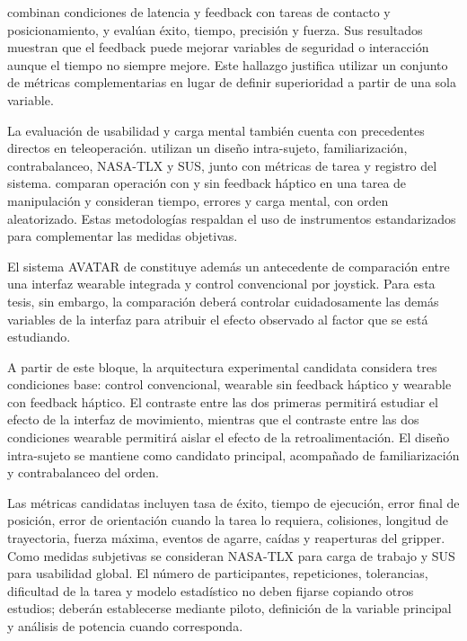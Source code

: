 \textcite{louca2024haptic} combinan condiciones de latencia y feedback con tareas de contacto y posicionamiento, y evalúan éxito, tiempo, precisión y fuerza. Sus resultados muestran que el feedback puede mejorar variables de seguridad o interacción aunque el tiempo no siempre mejore. Este hallazgo justifica utilizar un conjunto de métricas complementarias en lugar de definir superioridad a partir de una sola variable.

La evaluación de usabilidad y carga mental también cuenta con precedentes directos en teleoperación. \textcite{senft2021tasklevel} utilizan un diseño intra-sujeto, familiarización, contrabalanceo, NASA-TLX y SUS, junto con métricas de tarea y registro del sistema. \textcite{rodriguezsedano2024haptic} comparan operación con y sin feedback háptico en una tarea de manipulación y consideran tiempo, errores y carga mental, con orden aleatorizado. Estas metodologías respaldan el uso de instrumentos estandarizados para complementar las medidas objetivas.

El sistema AVATAR de \textcite{park2018avatar} constituye además un antecedente de comparación entre una interfaz wearable integrada y control convencional por joystick. Para esta tesis, sin embargo, la comparación deberá controlar cuidadosamente las demás variables de la interfaz para atribuir el efecto observado al factor que se está estudiando.

A partir de este bloque, la arquitectura experimental candidata considera tres condiciones base: control convencional, wearable sin feedback háptico y wearable con feedback háptico. El contraste entre las dos primeras permitirá estudiar el efecto de la interfaz de movimiento, mientras que el contraste entre las dos condiciones wearable permitirá aislar el efecto de la retroalimentación. El diseño intra-sujeto se mantiene como candidato principal, acompañado de familiarización y contrabalanceo del orden.

Las métricas candidatas incluyen tasa de éxito, tiempo de ejecución, error final de posición, error de orientación cuando la tarea lo requiera, colisiones, longitud de trayectoria, fuerza máxima, eventos de agarre, caídas y reaperturas del gripper. Como medidas subjetivas se consideran NASA-TLX para carga de trabajo y SUS para usabilidad global. El número de participantes, repeticiones, tolerancias, dificultad de la tarea y modelo estadístico no deben fijarse copiando otros estudios; deberán establecerse mediante piloto, definición de la variable principal y análisis de potencia cuando corresponda.

